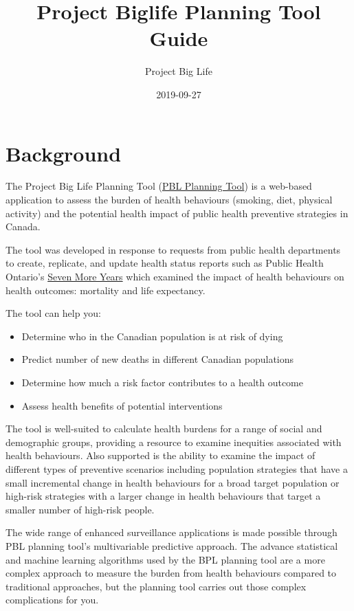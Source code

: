 \documentclass[]{book}
\title{Project Biglife Planning Tool Guide}
\author{Project Big Life}
\date{2019-09-27}
\providecommand{\tightlist}{%
  \setlength{\itemsep}{0pt}\setlength{\parskip}{0pt}}
\begin{document}
\maketitle

{
\setcounter{tocdepth}{1}
\tableofcontents
}
\hypertarget{background}{%
\chapter{Background}\label{background}}

The Project Big Life Planning Tool (\href{http://planning.projectbiglife.ca/}{PBL Planning Tool}) is a web-based application to assess the burden of health behaviours (smoking, diet, physical activity) and the potential health impact of public health preventive strategies in Canada.

The tool was developed in response to requests from public health departments to create, replicate, and update health status reports such as Public Health Ontario's \href{https://www.ices.on.ca/Publications/Atlases-and-Reports/2012/Seven-More-Years}{Seven More Years} which examined the impact of health behaviours on health outcomes: mortality and life expectancy.

The tool can help you:

\begin{itemize}
\tightlist
\item
  Determine who in the Canadian population is at risk of dying
\item
  Predict number of new deaths in different Canadian populations
\item
  Determine how much a risk factor contributes to a health outcome
\item
  Assess health benefits of potential interventions
\end{itemize}

The tool is well-suited to calculate health burdens for a range of social and demographic groups, providing a resource to examine inequities associated with health behaviours.\citep{manuel2018} Also supported is the ability to examine the impact of different types of preventive scenarios including population strategies that have a small incremental change in health behaviours for a broad target population or high-risk strategies with a larger change in health behaviours that target a smaller number of high-risk people.\citep{PoRTover}

The wide range of enhanced surveillance applications is made possible through PBL planning tool's multivariable predictive approach. The advance statistical and machine learning algorithms used by the BPL planning tool are a more complex approach to measure the burden from health behaviours compared to traditional approaches, but the planning tool carries out those complex complications for you.
\end{document}
